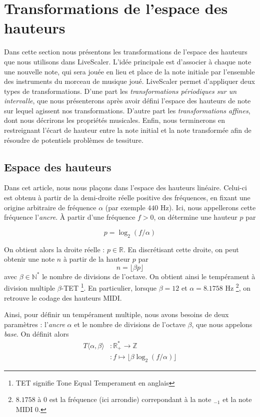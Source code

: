 \documentclass{article}
\begin{document}
\section{Transformations de l'espace des hauteurs}
Dans cette section nous présentons les transformations de l'espace des hauteurs que nous utilisons dans LiveScaler. L'idée principale est d'associer à chaque note une nouvelle note, qui sera jouée en lieu et place de la note initiale par l'ensemble des instruments du morceau de musique joué. LiveScaler permet d'appliquer deux types de transformations. D'une part les \emph{transformations périodiques sur un intervalle}, que nous présenterons après avoir défini l'espace des hauteurs de note sur lequel agissent nos transformations. D'autre part les \emph{transformations affines}, dont nous décrirons les propriétés musicales. Enfin, nous terminerons en restreignant l'écart de hauteur entre la note initial et la note transformée afin de résoudre de potentiels problèmes de tessiture.

\subsection{Espace des hauteurs}
Dans cet article, nous nous plaçons dans l'espace des hauteurs linéaire. Celui-ci est obtenu à partir de la demi-droite réelle positive des fréquences, en fixant une origine arbitraire de fréquence $\alpha$ (par exemple $440$ Hz). Ici, nous appellerons cette fréquence l'\emph{ancre}.  À partir d'une fréquence $f>0$, on détermine une hauteur $p$ par

$$p = \log_2(f/\alpha)$$

On obtient alors la droite réelle : $p\in \mathbb{R}$. En discrétisant cette droite, on peut obtenir une note $n$ à partir de la hauteur $p$ par
$$n = \lfloor \beta p \rfloor$$
\noindent avec $\beta\in \mathbb{N}^*$ le nombre de divisions de l'octave. On obtient ainsi le tempérament à division multiple $\beta$-TET \footnote{TET signifie Tone Equal Temperament en anglais}. En particulier, lorsque $\beta = 12$ et $\alpha = 8.1758$ Hz \footnote{ $8.1758$ à $0$ est la fréquence (ici arrondie) correpondant à la note $_{-1}$ et la note MIDI $0$.}, on retrouve le codage des hauteurs MIDI.

Ainsi, pour définir un tempérament multiple, nous avons besoins de deux paramètres : l'\emph{ancre} $\alpha$  et le nombre de divisions de l'octave $\beta$, que nous appelons \emph{base}. On définit alors \begin{align*}
  T\langle \alpha, \beta \rangle &: \mathbb{R}_+^* \rightarrow \mathbb{Z}\\
  &:f \mapsto \lfloor \beta \log_2(f/\alpha)\rfloor
\end{align*}
\end{document}
